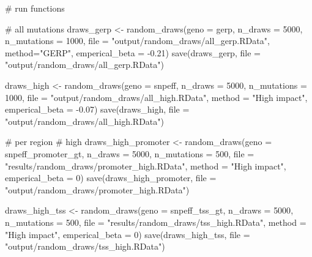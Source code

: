 \documentclass[
  letterpaper,
  DIV=11,
  numbers=noendperiod]{scrreprt}
\newenvironment{Shaded}{}{}
\newcommand{\AttributeTok}[1]{\textcolor[rgb]{0.84,0.23,0.29}{#1}}
\newcommand{\CommentTok}[1]{\textcolor[rgb]{0.42,0.45,0.49}{#1}}
\newcommand{\DecValTok}[1]{\textcolor[rgb]{0.00,0.36,0.77}{#1}}
\newcommand{\FloatTok}[1]{\textcolor[rgb]{0.00,0.36,0.77}{#1}}
\newcommand{\FunctionTok}[1]{\textcolor[rgb]{0.44,0.26,0.76}{#1}}
\newcommand{\NormalTok}[1]{\textcolor[rgb]{0.14,0.16,0.18}{#1}}
\newcommand{\OtherTok}[1]{\textcolor[rgb]{0.44,0.26,0.76}{#1}}
\newcommand{\SpecialCharTok}[1]{\textcolor[rgb]{0.00,0.36,0.77}{#1}}
\newcommand{\StringTok}[1]{\textcolor[rgb]{0.01,0.18,0.38}{#1}}
\begin{document}
\begin{Shaded}
\begin{Highlighting}[]
\CommentTok{\# run functions}

\CommentTok{\# all mutations}
\NormalTok{draws\_gerp }\OtherTok{\textless{}{-}} \FunctionTok{random\_draws}\NormalTok{(}\AttributeTok{geno =}\NormalTok{ gerp, }\AttributeTok{n\_draws =} \DecValTok{5000}\NormalTok{, }\AttributeTok{n\_mutations =} \DecValTok{1000}\NormalTok{, }\AttributeTok{file =} \StringTok{"output/random\_draws/all\_gerp.RData"}\NormalTok{, }\AttributeTok{method=}\StringTok{"GERP"}\NormalTok{, }\AttributeTok{emperical\_beta =} \SpecialCharTok{{-}}\FloatTok{0.21}\NormalTok{)}
\FunctionTok{save}\NormalTok{(draws\_gerp, }\AttributeTok{file =} \StringTok{"output/random\_draws/all\_gerp.RData"}\NormalTok{)}

\NormalTok{draws\_high }\OtherTok{\textless{}{-}} \FunctionTok{random\_draws}\NormalTok{(}\AttributeTok{geno =}\NormalTok{ snpeff, }\AttributeTok{n\_draws =} \DecValTok{5000}\NormalTok{, }\AttributeTok{n\_mutations =} \DecValTok{1000}\NormalTok{, }\AttributeTok{file =} \StringTok{"output/random\_draws/all\_high.RData"}\NormalTok{, }\AttributeTok{method =} \StringTok{"High impact"}\NormalTok{, }\AttributeTok{emperical\_beta =} \SpecialCharTok{{-}}\FloatTok{0.07}\NormalTok{)}
\FunctionTok{save}\NormalTok{(draws\_high, }\AttributeTok{file =} \StringTok{"output/random\_draws/all\_high.RData"}\NormalTok{)}

\CommentTok{\# per region}
\CommentTok{\# high}
\NormalTok{draws\_high\_promoter }\OtherTok{\textless{}{-}} \FunctionTok{random\_draws}\NormalTok{(}\AttributeTok{geno =}\NormalTok{ snpeff\_promoter\_gt, }\AttributeTok{n\_draws =} \DecValTok{5000}\NormalTok{, }\AttributeTok{n\_mutations =} \DecValTok{500}\NormalTok{, }\AttributeTok{file =} \StringTok{"results/random\_draws/promoter\_high.RData"}\NormalTok{, }\AttributeTok{method =} \StringTok{"High impact"}\NormalTok{, }\AttributeTok{emperical\_beta =} \DecValTok{0}\NormalTok{)}
\FunctionTok{save}\NormalTok{(draws\_high\_promoter, }\AttributeTok{file =} \StringTok{"output/random\_draws/promoter\_high.RData"}\NormalTok{)}

\NormalTok{draws\_high\_tss }\OtherTok{\textless{}{-}} \FunctionTok{random\_draws}\NormalTok{(}\AttributeTok{geno =}\NormalTok{ snpeff\_tss\_gt, }\AttributeTok{n\_draws =} \DecValTok{5000}\NormalTok{, }\AttributeTok{n\_mutations =} \DecValTok{500}\NormalTok{, }\AttributeTok{file =} \StringTok{"results/random\_draws/tss\_high.RData"}\NormalTok{, }\AttributeTok{method =} \StringTok{"High impact"}\NormalTok{, }\AttributeTok{emperical\_beta =} \DecValTok{0}\NormalTok{)}
\FunctionTok{save}\NormalTok{(draws\_high\_tss, }\AttributeTok{file =} \StringTok{"output/random\_draws/tss\_high.RData"}\NormalTok{)}


\end{Highlighting}
\end{Shaded}
\end{document}
